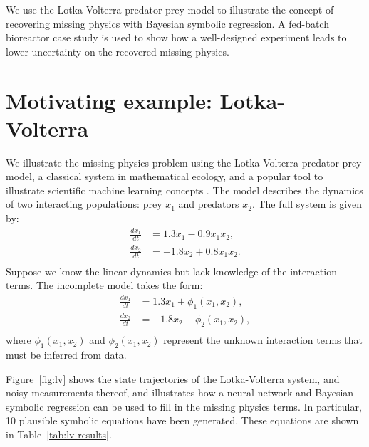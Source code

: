 \documentclass{ifacconf}
\begin{document}
	We use the Lotka-Volterra predator-prey model to illustrate the concept of recovering missing physics with Bayesian symbolic regression. A fed-batch bioreactor case study is used to show how a well-designed experiment leads to lower uncertainty on the recovered missing physics.
	
	\section{Motivating example: Lotka-Volterra}
	We illustrate the missing physics problem using the Lotka-Volterra predator-prey model, a classical system in mathematical ecology, and a popular tool to illustrate scientific machine learning concepts \citep{rackauckas1}.
	The model describes the dynamics of two interacting populations: prey $x_1$ and predators $x_2$.
	The full system is given by:
	\begin{equation}\label{eq:lv}
		\begin{aligned}
			\frac{dx_1}{dt} &= 1.3 x_1 - 0.9 x_1x_2,\\
			\frac{dx_2}{dt} &= -1.8 x_2 + 0.8 x_1x_2.\\
		\end{aligned}
	\end{equation}
	Suppose we know the linear dynamics but lack knowledge of the interaction terms.
	The incomplete model takes the form:
	\begin{equation}\label{eq:lv-missing}
		\begin{aligned}
			\frac{dx_1}{dt} &= 1.3 x_1 + \phi_1(x_1,x_2),\\
			\frac{dx_2}{dt} &= -1.8 x_2 + \phi_2(x_1,x_2),\\
		\end{aligned}
	\end{equation}
	where $\phi_1(x_1,x_2)$ and $\phi_2(x_1,x_2)$ represent the unknown interaction terms that must be inferred from data.
	
	Figure~\ref{fig:lv} shows the state trajectories of the Lotka-Volterra system, and noisy measurements thereof,
	and illustrates how a neural network and Bayesian symbolic regression can be used to fill in the missing physics terms.
	In particular, 10 plausible symbolic equations have been generated.
	These equations are shown in Table~\ref{tab:lv-results}.
	
\end{document}

